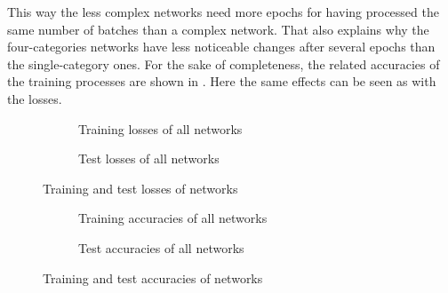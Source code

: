 This way the less complex networks need more epochs for having processed the same number of batches than a complex network.
That also explains why the four-categories networks have less noticeable changes after several epochs than the single-category ones.
For the sake of completeness, the related accuracies of the training processes are shown in .
Here the same effects can be seen as with the losses.
\begin{figure}
	\setlength{}
	\setlength{}
	\centering
	\begin{subfigure}{\textwidth}
		\centering
		
		\caption{Training losses of all networks}
		\label{fig:train-loss}
	\end{subfigure}
	\begin{subfigure}{\textwidth}
		\centering
		
		\caption{Test losses of all networks}
		\label{fig:test-loss}
	\end{subfigure}
	\caption{Training and test losses of networks}
	\label{fig:networks-loss}
\end{figure}
\begin{figure}
	\setlength{}
	\setlength{}
	\centering
	\begin{subfigure}{\textwidth}
		\centering
		
		\caption{Training accuracies of all networks}
		\label{fig:train-accuracy}
	\end{subfigure}
	\begin{subfigure}{\textwidth}
		\centering
		
		\caption{Test accuracies of all networks}
		\label{fig:test-accuracy}
	\end{subfigure}
	\caption{Training and test accuracies of networks}
	\label{fig:networks-accuracy}
\end{figure}